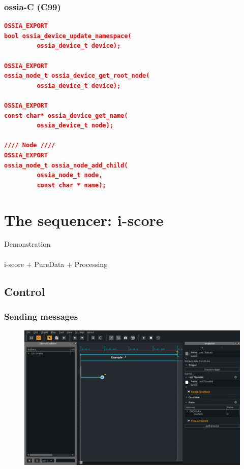 \documentclass[handout]{beamer}
\begin{document}
\begin{frame}[fragile]
\frametitle{ossia-C (C99)}
\small
\begin{lstlisting}[language=json]
OSSIA_EXPORT
bool ossia_device_update_namespace(
         ossia_device_t device);

OSSIA_EXPORT
ossia_node_t ossia_device_get_root_node(
         ossia_device_t device);

OSSIA_EXPORT
const char* ossia_device_get_name(
         ossia_device_t node);

//// Node ////
OSSIA_EXPORT
ossia_node_t ossia_node_add_child(
         ossia_node_t node,
         const char * name);
\end{lstlisting}
\end{frame}

\section{The sequencer: i-score}

\begin{frame}
\centering
\Huge Demonstration
~\\
~\\
\Large i-score + PureData + Processing
\end{frame}

\subsection{Control}

\begin{frame}
\frametitle{Sending messages}
\Large
\begin{figure}
    \includegraphics[width=\textwidth]{images/state.png}
\end{figure}
\end{frame}
\end{document}
